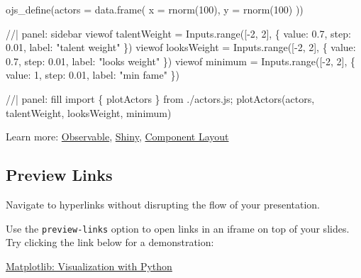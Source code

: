 \documentclass[
  letterpaper,
  DIV=11,
  numbers=noendperiod]{scrartcl}
\newenvironment{Shaded}{\begin{snugshade}}{\end{snugshade}}
\newcommand{\AttributeTok}[1]{\textcolor[rgb]{0.40,0.45,0.13}{#1}}
\newcommand{\DecValTok}[1]{\textcolor[rgb]{0.68,0.00,0.00}{#1}}
\newcommand{\FunctionTok}[1]{\textcolor[rgb]{0.28,0.35,0.67}{#1}}
\newcommand{\NormalTok}[1]{\textcolor[rgb]{0.00,0.23,0.31}{#1}}
\begin{document}
\begin{Shaded}
\begin{Highlighting}[]
\FunctionTok{ojs\_define}\NormalTok{(}\AttributeTok{actors =} \FunctionTok{data.frame}\NormalTok{(}
  \AttributeTok{x =} \FunctionTok{rnorm}\NormalTok{(}\DecValTok{100}\NormalTok{),}
  \AttributeTok{y =} \FunctionTok{rnorm}\NormalTok{(}\DecValTok{100}\NormalTok{)}
\NormalTok{))}
\end{Highlighting}
\end{Shaded}

\begin{Shaded}
\begin{Highlighting}[]
\NormalTok{//| panel: sidebar}
\NormalTok{viewof talentWeight = Inputs.range([{-}2, 2], \{ value: 0.7, step: 0.01, label: "talent weight" \})}
\NormalTok{viewof looksWeight = Inputs.range([{-}2, 2], \{ value: 0.7, step: 0.01, label: "looks weight" \})}
\NormalTok{viewof minimum = Inputs.range([{-}2, 2], \{ value: 1, step: 0.01, label: "min fame" \})}
\end{Highlighting}
\end{Shaded}

\begin{Shaded}
\begin{Highlighting}[]
\NormalTok{//| panel: fill}
\NormalTok{import \{ plotActors \} from \textquotesingle{}./actors.js\textquotesingle{};}
\NormalTok{plotActors(actors, talentWeight, looksWeight, minimum)}
\end{Highlighting}
\end{Shaded}

Learn more:
\href{https://?meta:prerelease-subdomainquarto.org/docs/interactive/ojs/}{Observable},
\href{https://?meta:prerelease-subdomainquarto.org/docs/interactive/shiny/}{Shiny},
\href{https://?meta:prerelease-subdomainquarto.org/docs/interactive/layout.html}{Component
Layout}

\subsection{Preview Links}\label{preview-links}

Navigate to hyperlinks without disrupting the flow of your presentation.

Use the \texttt{preview-links} option to open links in an iframe on top
of your slides. Try clicking the link below for a demonstration:

\href{https://matplotlib.org/}{Matplotlib: Visualization with Python}
\end{document}
